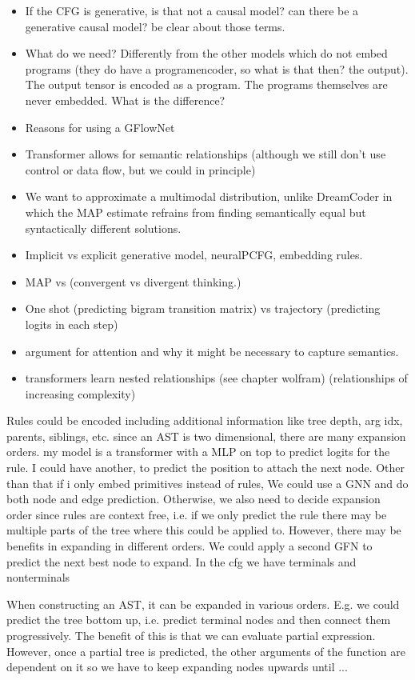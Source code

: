 \begin{itemize}
    \item If the CFG is generative, is that not a causal model? can there be a generative causal model? be clear about those terms. 
    \item What do we need? Differently from the other models which do not embed programs (they do have a programencoder, so what is that then? the output). The output tensor is encoded as a program. The programs themselves are never embedded. What is the difference?
    \item Reasons for using a GFlowNet 
    \item Transformer allows for semantic relationships (although we still don't use control or data flow, but we could in principle)
    \item We want to approximate a multimodal distribution, unlike DreamCoder in which the MAP estimate refrains from finding semantically equal but syntactically different solutions.
    \item Implicit vs explicit generative model, neuralPCFG, embedding rules. 
    \item MAP vs  (convergent vs divergent thinking.)
    \item One shot (predicting bigram transition matrix) vs trajectory (predicting logits in each step)
    \item argument for attention and why it might be necessary to capture semantics.
    \item transformers learn nested relationships (see chapter wolfram) (relationships of increasing complexity)
\end{itemize}
    



Rules could be encoded including additional information like tree depth, arg idx, parents, siblings, etc. 
since an AST is two dimensional, there are many expansion orders. 
my model is a transformer with a MLP on top to predict logits for the rule. I could have another, to predict the position to attach the next node. Other than that if i only embed primitives instead of rules, 
We could use a GNN and do both node and edge prediction. 
Otherwise, we also need to decide expansion order since rules are context free, i.e. if we only predict the rule there may be multiple parts of the tree where this could be applied to. However, there may be benefits in expanding in different orders. We could apply a second GFN to predict the next best node to expand.
In the cfg we have terminals and nonterminals

When constructing an AST, it can be expanded in various orders.
E.g. we could predict the tree bottom up, i.e. predict terminal nodes and then connect them progressively. The benefit of this is that we can evaluate partial expression. However, once a partial tree is predicted, the other arguments of the function are dependent on it so we have to keep expanding nodes upwards until ...

